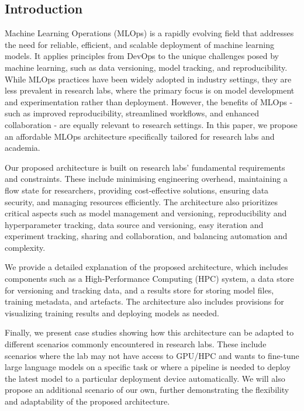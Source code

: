 \subsection{Introduction \label{introduction}}

Machine Learning Operations (MLOps) is a rapidly evolving field that addresses the need for reliable, efficient, and scalable deployment of machine learning models. It applies principles from DevOps to the unique challenges posed by machine learning, such as data versioning, model tracking, and reproducibility. While MLOps practices have been widely adopted in industry settings, they are less prevalent in research labs, where the primary focus is on model development and experimentation rather than deployment. However, the benefits of MLOps - such as improved reproducibility, streamlined workflows, and enhanced collaboration - are equally relevant to research settings. In this paper, we propose an affordable MLOps architecture specifically tailored for research labs and academia.


Our proposed architecture is built on research labs' fundamental requirements and constraints. These include minimising engineering overhead, maintaining a flow state for researchers, providing cost-effective solutions, ensuring data security, and managing resources efficiently. The architecture also prioritizes critical aspects such as model management and versioning, reproducibility and hyperparameter tracking, data source and versioning, easy iteration and experiment tracking, sharing and collaboration, and balancing automation and complexity.

We provide a detailed explanation of the proposed architecture, which includes components such as a High-Performance Computing (HPC) system, a data store for versioning and tracking data, and a results store for storing model files, training metadata, and artefacts. The architecture also includes provisions for visualizing training results and deploying models as needed.


Finally, we present case studies showing how this architecture can be adapted to different scenarios commonly encountered in research labs. These include scenarios where the lab may not have access to GPU/HPC and wants to fine-tune large language models on a specific task or where a pipeline is needed to deploy the latest model to a particular deployment device automatically. We will also propose an additional scenario of our own, further demonstrating the flexibility and adaptability of the proposed architecture.

